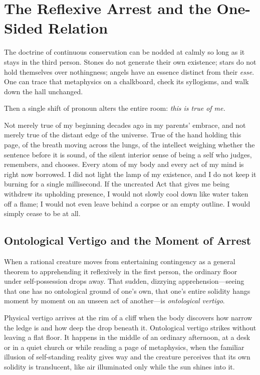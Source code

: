 \section{The Reflexive Arrest and the One-Sided Relation}

The doctrine of continuous conservation can be nodded at calmly so long as it stays in the third person. Stones do not generate their own existence; stars do not hold themselves over nothingness; angels have an essence distinct from their \emph{esse}. One can trace that metaphysics on a chalkboard, check its syllogisms, and walk down the hall unchanged.

Then a single shift of pronoun alters the entire room: \emph{this is true of me.}

Not merely true of my beginning decades ago in my parents' embrace, and not merely true of the distant edge of the universe. True of the hand holding this page, of the breath moving across the lungs, of the intellect weighing whether the sentence before it is sound, of the silent interior sense of being a self who judges, remembers, and chooses. Every atom of my body and every act of my mind is right now borrowed. I did not light the lamp of my existence, and I do not keep it burning for a single millisecond. If the uncreated Act that gives me being withdrew its upholding presence, I would not slowly cool down like water taken off a flame; I would not even leave behind a corpse or an empty outline. I would simply cease to be at all.

\subsection{Ontological Vertigo and the Moment of Arrest}

When a rational creature moves from entertaining contingency as a general theorem to apprehending it reflexively in the first person, the ordinary floor under self-possession drops away. That sudden, dizzying apprehension---seeing that one has no ontological ground of one's own, that one's entire solidity hangs moment by moment on an unseen act of another---is \emph{ontological vertigo}.

Physical vertigo arrives at the rim of a cliff when the body discovers how narrow the ledge is and how deep the drop beneath it. Ontological vertigo strikes without leaving a flat floor. It happens in the middle of an ordinary afternoon, at a desk or in a quiet church or while reading a page of metaphysics, when the familiar illusion of self-standing reality gives way and the creature perceives that its own solidity is translucent, like air illuminated only while the sun shines into it.

